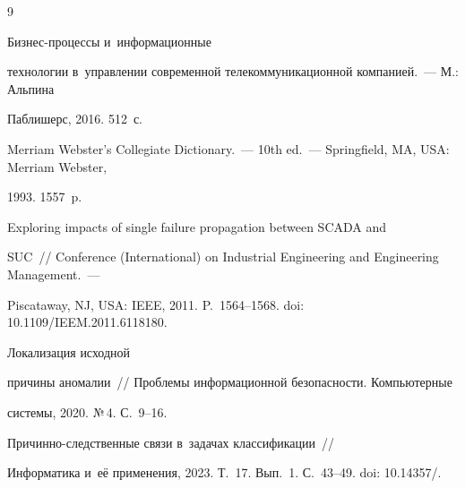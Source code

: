 {\small\frenchspacing


{%




\begin{thebibliography}{9}




 Биз\-нес-про\-цес\-сы и~информационные 


технологии в~управ\-ле\-нии современной телекоммуникационной компанией.~--- М.: Альпина 


Паблишерс, 2016. 512~с.




Merriam Webster's Collegiate Dictionary.~--- 10th ed.~--- Springfield, MA, USA: Merriam Webster, 


1993. 1557~p.




 Exploring impacts of single failure propagation between SCADA and 


SUC~/\!\!/   Conference (International) on Industrial Engineering and Engineering Management.~--- 


Piscataway, NJ, USA: IEEE, 2011. P.~1564--1568. doi: 10.1109\!/\linebreak IEEM.2011.6118180.







 Локализация исходной 


причины аномалии~/\!\!/ Проб\-ле\-мы информационной безопас\-ности. Компьютерные  


сис\-те\-мы, 2020. №\,4. С.~9--16.







 При\-чин\-но-след\-ст\-вен\-ные связи в~задачах классификации~/\!\!/ 


Информатика и~её применения, 2023. Т.~17. Вып.~1. С.~43--49.  doi: 10.14357\!/.








\end{thebibliography}}}
